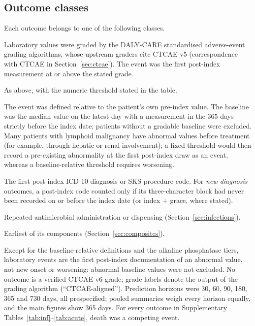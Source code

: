 \documentclass[10pt]{article}
\begin{document}
\subsection{Outcome classes}
Each outcome belongs to one of the following classes.
\begin{description}[style=nextline,leftmargin=1.2em]
\item[Graded laboratory (DALY-CARE grading).] Laboratory values were graded by
the DALY-CARE standardised adverse-event grading algorithms, whose upstream
graders cite CTCAE v5 (correspondence with CTCAE in Section~\ref{sec:ctcae}). The event was the
first post-index measurement at or above the stated grade.
\item[Local laboratory threshold.] As above, with the numeric threshold stated
in the table.
\item[Baseline-relative laboratory.] The event was defined relative to the
patient's own pre-index value. The baseline was the median value on the latest
day with a measurement in the 365 days strictly before the index date; patients
without a gradable baseline were excluded. Many patients with lymphoid
malignancy have abnormal values before treatment (for example, through
hepatic or renal involvement); a fixed threshold would then record a
pre-existing abnormality at the first post-index draw as an event, whereas a
baseline-relative threshold requires worsening.
\item[Registry diagnosis or procedure.] The first post-index ICD-10 diagnosis
or SKS procedure code. For \emph{new-diagnosis} outcomes, a post-index code
counted only if its three-character block had never been recorded on or before
the index date (or index $+$ grace, where stated).
\item[Medication-use proxy.] Repeated antimicrobial administration or
dispensing (Section~\ref{sec:infections}).
\item[Composite.] Earliest of its components (Section~\ref{sec:composites}).
\end{description}

Except for the baseline-relative definitions and the alkaline phosphatase
tiers, laboratory events are the first post-index documentation of an abnormal
value, not new onset or worsening: abnormal baseline values were not excluded.
No outcome is a verified CTCAE v6 grade; grade labels denote the output of the
grading algorithm (``CTCAE-aligned''). Prediction horizons were 30, 60, 90, 180,
365 and 730 days, all prespecified; pooled summaries weigh every horizon equally,
and the main figures show 365 days. For every outcome in
Supplementary Tables~\ref{tab:inf}--\ref{tab:acute}, death was a competing event.
\end{document}
